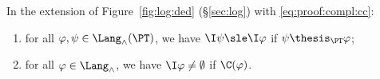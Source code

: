 \begin{lemma}
\label{lem:proof:compl:fin:ded:cor}
In the extension of Figure~\ref{fig:log:ded} (\S\ref{sec:log})
with \eqref{eq:proof:compl:cc}:
\begin{enumerate}[(1)]
\item
for all $\varphi,\psi \in \Lang_\land(\PT)$,
we have
$\I\psi \sle \I\varphi$
if
$\psi \thesis_\PT \varphi$;

\item
for all $\varphi \in \Lang_\land$,
we have
$\I\varphi \neq \emptyset$
if
$\C(\varphi)$.
\end{enumerate}
\end{lemma}





